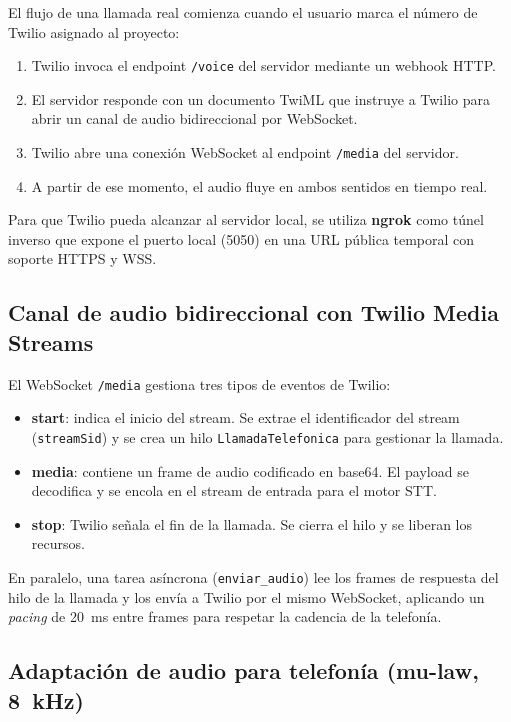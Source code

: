 El flujo de una llamada real comienza cuando el usuario marca el número de Twilio asignado al proyecto:

\begin{enumerate}
    \item Twilio invoca el endpoint \texttt{/voice} del servidor mediante un webhook HTTP.
    \item El servidor responde con un documento TwiML que instruye a Twilio para abrir un canal de audio bidireccional por WebSocket.
    \item Twilio abre una conexión WebSocket al endpoint \texttt{/media} del servidor.
    \item A partir de ese momento, el audio fluye en ambos sentidos en tiempo real.
\end{enumerate}

Para que Twilio pueda alcanzar al servidor local, se utiliza \textbf{ngrok} como túnel inverso que expone el puerto local (5050) en una URL pública temporal con soporte HTTPS y WSS.

\subsection{Canal de audio bidireccional con Twilio Media Streams}
\label{subsec:media_streams}

El WebSocket \texttt{/media} gestiona tres tipos de eventos de Twilio:

\begin{itemize}
    \item \textbf{start}: indica el inicio del stream. Se extrae el identificador del stream (\texttt{streamSid}) y se crea un hilo \texttt{LlamadaTelefonica} para gestionar la llamada.
    \item \textbf{media}: contiene un frame de audio codificado en base64. El payload se decodifica y se encola en el stream de entrada para el motor STT.
    \item \textbf{stop}: Twilio señala el fin de la llamada. Se cierra el hilo y se liberan los recursos.
\end{itemize}

En paralelo, una tarea asíncrona (\texttt{enviar\_audio}) lee los frames de respuesta del hilo de la llamada y los envía a Twilio por el mismo WebSocket, aplicando un \textit{pacing} de 20~ms entre frames para respetar la cadencia de la telefonía.

\subsection{Adaptación de audio para telefonía (mu-law, 8~kHz)}
\label{subsec:adaptacion_audio}

